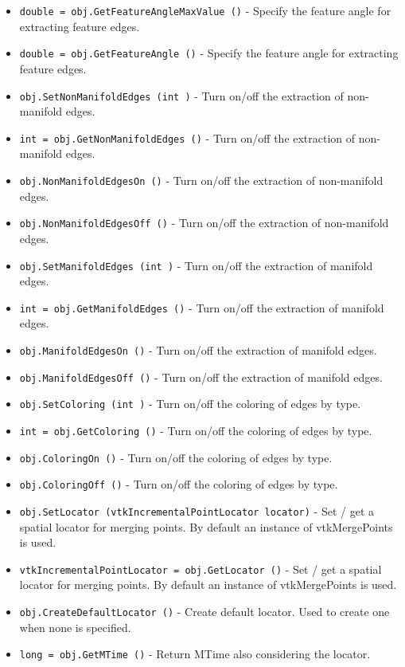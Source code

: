 \begin{itemize}
\item  \verb|double = obj.GetFeatureAngleMaxValue ()| -  Specify the feature angle for extracting feature edges.

\item  \verb|double = obj.GetFeatureAngle ()| -  Specify the feature angle for extracting feature edges.

\item  \verb|obj.SetNonManifoldEdges (int )| -  Turn on/off the extraction of non-manifold edges.

\item  \verb|int = obj.GetNonManifoldEdges ()| -  Turn on/off the extraction of non-manifold edges.

\item  \verb|obj.NonManifoldEdgesOn ()| -  Turn on/off the extraction of non-manifold edges.

\item  \verb|obj.NonManifoldEdgesOff ()| -  Turn on/off the extraction of non-manifold edges.

\item  \verb|obj.SetManifoldEdges (int )| -  Turn on/off the extraction of manifold edges.

\item  \verb|int = obj.GetManifoldEdges ()| -  Turn on/off the extraction of manifold edges.

\item  \verb|obj.ManifoldEdgesOn ()| -  Turn on/off the extraction of manifold edges.

\item  \verb|obj.ManifoldEdgesOff ()| -  Turn on/off the extraction of manifold edges.

\item  \verb|obj.SetColoring (int )| -  Turn on/off the coloring of edges by type.

\item  \verb|int = obj.GetColoring ()| -  Turn on/off the coloring of edges by type.

\item  \verb|obj.ColoringOn ()| -  Turn on/off the coloring of edges by type.

\item  \verb|obj.ColoringOff ()| -  Turn on/off the coloring of edges by type.

\item  \verb|obj.SetLocator (vtkIncrementalPointLocator locator)| -  Set / get a spatial locator for merging points. By
 default an instance of vtkMergePoints is used.

\item  \verb|vtkIncrementalPointLocator = obj.GetLocator ()| -  Set / get a spatial locator for merging points. By
 default an instance of vtkMergePoints is used.

\item  \verb|obj.CreateDefaultLocator ()| -  Create default locator. Used to create one when none is specified.

\item  \verb|long = obj.GetMTime ()| -  Return MTime also considering the locator.

\end{itemize}
